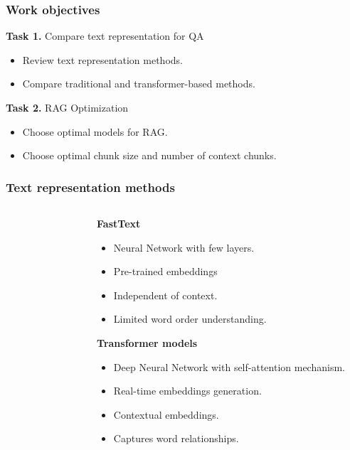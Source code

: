 \documentclass{beamer}
\begin{document}
\begin{frame}
\end{frame}


\begin{frame}
  \frametitle{Work objectives}
  \textcolor{cvut_navy}{\textbf{Task 1.}} Compare text representation for QA
  \begin{itemize}
    \item Review text representation methods.
    \item Compare traditional and transformer-based methods.
  \end{itemize}
  \textcolor{cvut_navy}{\textbf{Task 2.}} RAG Optimization
  \begin{itemize}
    \item Choose optimal models for RAG.
    \item Choose optimal chunk size and number of context chunks.
  \end{itemize}
  \bigskip
  
\end{frame}


\begin{frame}[t]
  \frametitle{Text representation methods}
  \begin{columns}[onlytextwidth]
    \begin{column}{0.5\textwidth}
      \begin{figure}
        
      \end{figure}
    \end{column}
    \begin{column}{0.55\textwidth}
      \textcolor{cvut_navy}{\textbf{FastText}}
      \begin{itemize}
        \item Neural Network with few layers.      
        \item Pre-trained embeddings
        \item Independent of context.
        \item Limited word order understanding.        
      \end{itemize}
      \textcolor{cvut_navy}{\textbf{Transformer models}}
      \begin{itemize}
        \item Deep Neural Network with self-attention mechanism.
        \item Real-time embeddings generation.
        \item Contextual embeddings.        
        \item Captures word relationships.
      \end{itemize}
    \end{column}
  \end{columns}
\end{frame}
\end{document}
